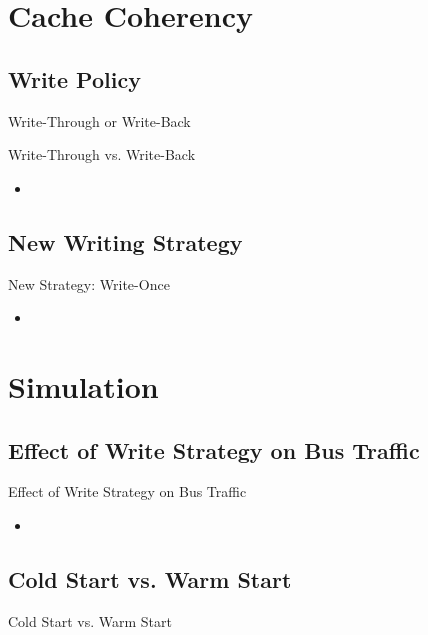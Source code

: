 \documentclass{beamer}
\begin{document}
\section{Cache Coherency}

\subsection{Write Policy}
\begin{frame}{Write-Through or Write-Back}
	\begin{block}{Write-Through vs. Write-Back}
		
	\end{block}
	
	\begin{itemize}
		\item {
			
		}
	\end{itemize}
\end{frame}

\subsection{New Writing Strategy}

\begin{frame}{New Strategy: Write-Once}
	\begin{itemize}
		\item {
			}
	\end{itemize}
\end{frame}

\section{Simulation}
\subsection{Effect of Write Strategy on Bus Traffic}
\begin{frame}{Effect of Write Strategy on Bus Traffic}
	\begin{itemize}
		\item {
			}
	\end{itemize}
\end{frame}

\subsection{Cold Start vs. Warm Start}
\begin{frame}{Cold Start vs. Warm Start}
	
\end{frame}
\end{document}
